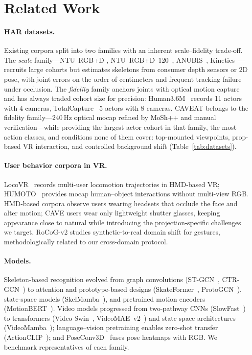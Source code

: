 \documentclass[10pt,twocolumn,letterpaper]{article}
\newcommand{\DATASET}{CAVEAT}
\begin{document}
\section{Related Work}
\paragraph{HAR datasets.}
Existing corpora split into two families with an inherent
scale--fidelity trade-off. The \emph{scale} family---NTU~RGB+D
\cite{shahroudy2016ntu}, NTU~RGB+D~120~\cite{liu2020ntu120},
ANUBIS~\cite{yu2022anubis}, Kinetics~\cite{kay2017kinetics}---recruits
large cohorts but estimates skeletons from consumer depth sensors or 2D
pose, with joint errors on the order of centimeters and frequent tracking
failure under occlusion. The \emph{fidelity} family anchors joints with
optical motion capture and has always traded cohort size for precision:
Human3.6M~\cite{ionescu2014h36m} records 11 actors with 4 cameras,
TotalCapture~\cite{trumble2017totalcapture} 5 actors with 8 cameras.
\DATASET{} belongs to the fidelity family---240\,Hz optical mocap refined
by MoSh++ and manual verification---while providing the largest actor
cohort in that family, the most action classes, and conditions none of
them cover: top-mounted viewpoints, prop-based VR interaction, and
controlled background shift (Table~\ref{tab:datasets}).

\paragraph{User behavior corpora in VR.}
LocoVR~\cite{takeyama2024locovr} records multi-user locomotion trajectories
in HMD-based VR; HUMOTO~\cite{lu2025humoto} provides mocap human--object
interactions without multi-view RGB. HMD-based corpora observe users
wearing headsets that occlude the face and alter motion; CAVE users wear
only lightweight shutter glasses, keeping appearance close to natural while
introducing the projection-specific challenges we target. RoCoG-v2
\cite{reddy2023rocog} studies synthetic-to-real domain shift for gestures,
methodologically related to our cross-domain protocol.

\paragraph{Models.}
Skeleton-based recognition evolved from graph convolutions
(ST-GCN~\cite{yan2018stgcn}, CTR-GCN~\cite{chen2021ctrgcn}) to
attention and prototype-based designs (SkateFormer~\cite{do2024skateformer},
ProtoGCN~\cite{liu2025protogcn}), state-space models
(SkelMamba~\cite{martinel2024skelmamba}), and pretrained motion encoders
(MotionBERT~\cite{zhu2023motionbert}). Video models progressed from
two-pathway CNNs (SlowFast~\cite{feichtenhofer2019slowfast}) to
transformers (Video Swin~\cite{liu2022videoswin},
VideoMAE~v2~\cite{wang2023videomae2}) and state-space architectures
(VideoMamba~\cite{li2024videomamba}); language--vision pretraining enables
zero-shot transfer (ActionCLIP~\cite{wang2021actionclip}); and
PoseConv3D~\cite{duan2022poseconv3d} fuses pose heatmaps with RGB. We
benchmark representatives of each family.
\end{document}
